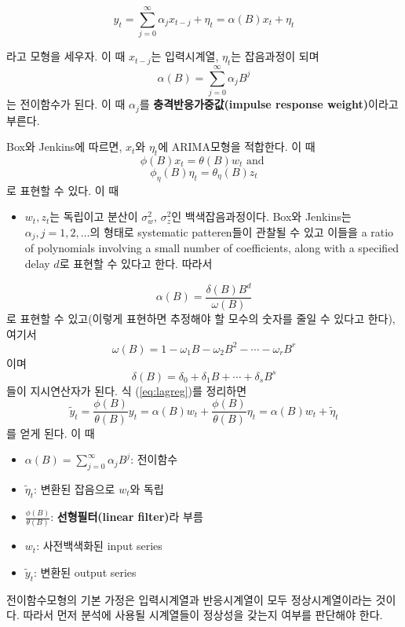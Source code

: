\documentclass[b5paper,]{scrbook}
\providecommand{\tightlist}{%
  \setlength{\itemsep}{0pt}\setlength{\parskip}{0pt}}
\theoremstyle{plain}
\theoremstyle{definition}
\numberwithin{equation}{section}
\begin{document}
\begin{equation}\label{eq:lagreg}
y_{t}=\sum_{j=0}^{\infty}\alpha_{j}x_{t-j}+\eta_{t}=\alpha(B)x_{t}+\eta_{t}
\end{equation}

라고 모형을 세우자. 이 때 \(x_{t-j}\)는 입력시계열, \(\eta_{t}\)는
잡음과정이 되며 \[\alpha(B)=\sum_{j=0}^{\infty}\alpha_{j}B^{j}\] 는
전이함수가 된다. 이 때 \(\alpha_{j}\)를 \textbf{충격반응가중값(impulse
response weight)}이라고 부른다.

Box와 Jenkins에 따르면, \(x_{t}\)와 \(\eta_{t}\)에 ARIMA모형을 적합한다.
이 때 \[\phi(B)x_{t}=\theta(B)w_{t} \text{ and }\]
\[\phi_{\eta}(B)\eta_{t}=\theta_{\eta}(B)z_{t}\] 로 표현할 수 있다. 이
때

\begin{itemize}
\tightlist
\item
  \(w_{t},z_{t}\)는 독립이고 분산이 \(\sigma_{w}^{2}\),
  \(\sigma_{z}^{2}\)인 백색잡음과정이다. Box와 Jenkins는
  \(\alpha_{j}, j=1,2,\ldots\)의 형태로 systematic patteren들이 관찰될
  수 있고 이들을 a ratio of polynomials involving a small number of
  coefficients, along with a specified delay \(d\)로 표현할 수 있다고
  한다. 따라서
\end{itemize}

\[\alpha(B)=\frac{\delta (B)B^{d}}{\omega(B)}\] 로 표현할 수 있고(이렇게
표현하면 추정해야 할 모수의 숫자를 줄일 수 있다고 한다), 여기서
\[\omega(B)=1-\omega_{1}B-\omega_{2}B^{2}-\cdots -\omega_{r}B^{r}\] 이며
\[\delta(B)=\delta_{0}+\delta_{1}B+\cdots +\delta_{s}B^{s}\] 들이
지시연산자가 된다. 식 (\eqref{eq:lagreg})를 정리하면
\[\tilde{y}_{t}=\frac{\phi(B)}{\theta(B)}y_{t}=\alpha(B)w_{t}+\frac{\phi(B)}{\theta(B)}\eta_{t}=\alpha(B)w_{t}+\tilde{\eta}_{t}\]
를 얻게 된다. 이 때

\begin{itemize}
\item
  \(\alpha(B)=\sum_{j=0}^{\infty}\alpha_{j}B^{j}\): 전이함수
\item
  \(\tilde{\eta}_{t}\): 변환된 잡음으로 \(w_{t}\)와 독립
\item
  \(\frac{\phi(B)}{\theta(B)}\): \textbf{선형필터(linear filter)}라 부름
\item
  \(w_{t}\): 사전백색화된 input series
\item
  \(\tilde{y}_{t}\): 변환된 output series
\end{itemize}

전이함수모형의 기본 가정은 입력시계열과 반응시계열이 모두
정상시계열이라는 것이다. 따라서 먼저 분석에 사용될 시계열들이 정상성을
갖는지 여부를 판단해야 한다.
\end{document}
